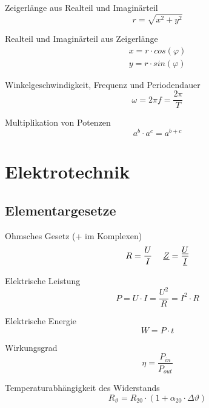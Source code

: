 \documentclass[11pt, a4paper, draft, fleqn, twocolumn]{article}
\numberwithin{equation}{subsection}
\begin{document}
\noindent Zeigerlänge aus Realteil und Imaginärteil
\begin{equation}
    r = \sqrt{x^2 + y^2}
\end{equation}

\noindent Realteil und Imaginärteil aus Zeigerlänge
\begin{equation}
\begin{split}
    x = r \cdot cos(\varphi) \\
    y = r \cdot sin(\varphi)
\end{split}
\end{equation}

\noindent Winkelgeschwindigkeit, Frequenz und Periodendauer
\begin{equation}
    \omega = 2\pi f = \frac{2\pi}{T}
\end{equation}

\noindent Multiplikation von Potenzen
\begin{equation}
    a^b \cdot a^c = a^{b+c}
\end{equation}



\section{Elektrotechnik}

\subsection{Elementargesetze}

Ohmsches Gesetz (+ im Komplexen)
\begin{equation}
    R = \frac{U}{I} \hspace{3ex}
    \underline{Z} = \frac{\underline{U}}{\underline{I}}
\end{equation}

\noindent Elektrische Leistung
\begin{equation}
    P = U \cdot I = \frac{U^2}{R} = I^2 \cdot R
\end{equation}

\noindent Elektrische Energie
\begin{equation}
    W = P \cdot t
\end{equation}

\noindent Wirkungsgrad
\begin{equation}
    \eta = \frac{P_{in}}{P_{out}}
\end{equation}

\noindent Temperaturabhängigkeit des Widerstands
\begin{equation}
    R_\vartheta = R_{20}\cdot(1 + \alpha_{20} \cdot \Delta \vartheta)
\end{equation}
\end{document}
